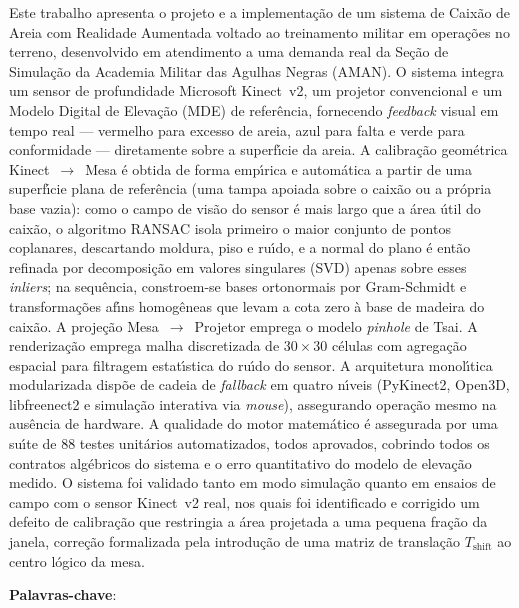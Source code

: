 \setlength{\absparsep}{18pt}
\begin{resumo}
\SingleSpacing
Este trabalho apresenta o projeto e a implementa\c{c}\~ao de um sistema de Caix\~ao de Areia com Realidade Aumentada voltado ao treinamento militar em opera\c{c}\~oes no terreno, desenvolvido em atendimento a uma demanda real da Se\c{c}\~ao de Simula\c{c}\~ao da Academia Militar das Agulhas Negras (AMAN). O sistema integra um sensor de profundidade Microsoft Kinect~v2, um projetor convencional e um Modelo Digital de Eleva\c{c}\~ao (MDE) de refer\^encia, fornecendo \emph{feedback} visual em tempo real --- vermelho para excesso de areia, azul para falta e verde para conformidade --- diretamente sobre a superf\'\i cie da areia. A calibra\c{c}\~ao geom\'etrica Kinect~$\to$~Mesa \'e obtida de forma emp\'\i rica e autom\'atica a partir de uma superf\'\i cie plana de refer\^encia (uma tampa apoiada sobre o caix\~ao ou a pr\'opria base vazia): como o campo de vis\~ao do sensor \'e mais largo que a \'area \'util do caix\~ao, o algoritmo RANSAC isola primeiro o maior conjunto de pontos coplanares, descartando moldura, piso e ru\'\i do, e a normal do plano \'e ent\~ao refinada por decomposi\c{c}\~ao em valores singulares (SVD) apenas sobre esses \emph{inliers}; na sequ\^encia, constroem-se bases ortonormais por Gram-Schmidt e transforma\c{c}\~oes af\'\i ns homog\^eneas que levam a cota zero \`a base de madeira do caix\~ao. A proje\c{c}\~ao Mesa~$\to$~Projetor emprega o modelo \emph{pinhole} de Tsai. A renderiza\c{c}\~ao emprega malha discretizada de $30 \times 30$ c\'elulas com agrega\c{c}\~ao espacial para filtragem estat\'\i stica do ru\'\i do do sensor. A arquitetura monol\'\i tica modularizada disp\~oe de cadeia de \emph{fallback} em quatro n\'\i veis (PyKinect2, Open3D, libfreenect2 e simula\c{c}\~ao interativa via \emph{mouse}), assegurando opera\c{c}\~ao mesmo na aus\^encia de hardware. A qualidade do motor matem\'atico \'e assegurada por uma su\'\i te de 88 testes unit\'arios automatizados, todos aprovados, cobrindo todos os contratos alg\'ebricos do sistema e o erro quantitativo do modelo de eleva\c{c}\~ao medido. O sistema foi validado tanto em modo simula\c{c}\~ao quanto em ensaios de campo com o sensor Kinect~v2 real, nos quais foi identificado e corrigido um defeito de calibra\c{c}\~ao que restringia a \'area projetada a uma pequena fra\c{c}\~ao da janela, corre\c{c}\~ao formalizada pela introdu\c{c}\~ao de uma matriz de transla\c{c}\~ao $T_{\text{shift}}$ ao centro l\'ogico da mesa.

\textbf{Palavras-chave}: \imprimirpalavraschave
\end{resumo}

